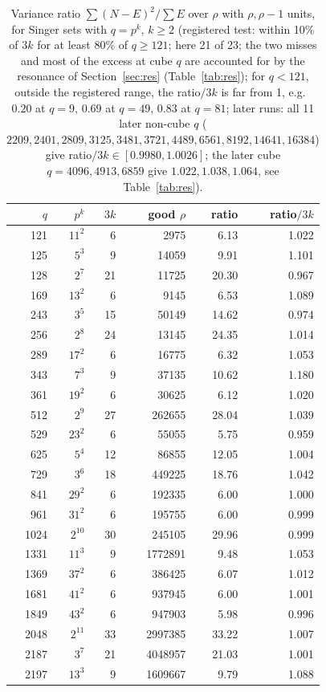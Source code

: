 \documentclass[11pt]{article}
\begin{document}
\begin{table}[h]\centering\small
\begin{tabular}{rrrrrr}\toprule $q$&$p^k$&$3k$&good $\rho$&ratio&ratio$/3k$\\ \midrule
121&$11^{2}$&6&2975&6.13&1.022\\
125&$5^{3}$&9&14059&9.91&1.101\\
128&$2^{7}$&21&11725&20.30&0.967\\
169&$13^{2}$&6&9145&6.53&1.089\\
243&$3^{5}$&15&50149&14.62&0.974\\
256&$2^{8}$&24&13145&24.35&1.014\\
289&$17^{2}$&6&16775&6.32&1.053\\
343&$7^{3}$&9&37135&10.62&1.180\\
361&$19^{2}$&6&30625&6.12&1.020\\
512&$2^{9}$&27&262655&28.04&1.039\\
529&$23^{2}$&6&55055&5.75&0.959\\
625&$5^{4}$&12&86855&12.05&1.004\\
729&$3^{6}$&18&449225&18.76&1.042\\
841&$29^{2}$&6&192335&6.00&1.000\\
961&$31^{2}$&6&195755&6.00&0.999\\
1024&$2^{10}$&30&245105&29.96&0.999\\
1331&$11^{3}$&9&1772891&9.48&1.053\\
1369&$37^{2}$&6&386425&6.07&1.012\\
1681&$41^{2}$&6&937945&6.00&1.001\\
1849&$43^{2}$&6&947903&5.98&0.996\\
2048&$2^{11}$&33&2997385&33.22&1.007\\
2187&$3^{7}$&21&4048957&21.03&1.001\\
2197&$13^{3}$&9&1609667&9.79&1.088\\
\bottomrule\end{tabular}
\caption{Variance ratio $\sum(N-E)^2/\sum E$ over $\rho$ with $\rho,\rho-1$ units, for Singer sets with $q=p^k$, $k\ge2$ (registered test: within 10\% of $3k$ for at least 80\% of $q\ge121$; here 21 of 23; the two misses and most of the excess at cube $q$ are accounted for by the resonance of Section~\ref{sec:res} (Table~\ref{tab:res}); for $q<121$, outside the registered range, the ratio$/3k$ is far from 1, e.g.\ $0.20$ at $q=9$, $0.69$ at $q=49$, $0.83$ at $q=81$; later runs: all 11 later non-cube $q$ ($2209,2401,2809,3125,3481,3721,4489,6561,8192,14641,16384$) give ratio$/3k\in[0.9980,1.0026]$; the later cube $q=4096,4913,6859$ give $1.022,1.038,1.064$, see Table~\ref{tab:res}).}\label{tab:pp}\end{table}
\end{document}
